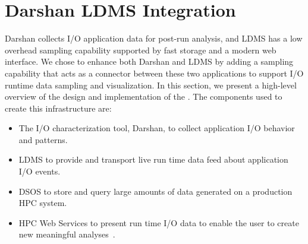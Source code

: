\section{Darshan LDMS Integration}
\label{sec:DarshanLDMSIntegration}

Darshan collects I/O application data for post-run analysis, and LDMS has a low 
overhead sampling capability supported by fast storage and a modern web interface. 
We chose to enhance both Darshan and LDMS by adding a sampling capability that acts 
as a connector between these two applications to support I/O runtime data sampling 
and visualization. In this section, we present a high-level overview of the design 
and implementation of the \Darshan{}. The components used to create this infrastructure are:
\begin{itemize}
	\item The I/O characterization tool, Darshan, to collect application I/O behavior and patterns. 
	\item LDMS to provide and transport live run time data feed about application I/O events.~\cite{ldmsgithubwiki}
	\item DSOS to store and query large amounts of data generated on a production HPC system.~\cite{sosgithub}
	\item HPC Web Services to present run time I/O data to enable the user to create new meaningful analyses~\cite{ClusterAV}.
\end{itemize}


